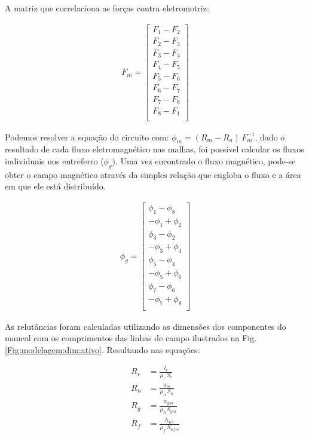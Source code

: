A matriz que correlaciona as forças contra eletromotriz:

\begin{align}
F_m = 
\begin{bmatrix}
	F_1 - F_2 \\
	F_2 - F_3 \\
	F_3 - F_4 \\
	F_4 - F_5 \\
	F_5 - F_6 \\
	F_6 - F_7 \\
	F_7 - F_8 \\
	F_8 - F_1 \\
\end{bmatrix}
\end{align}

Podemos resolver a equação do circuito com: $ \phi_m = (R_m - R_a) \, F_m^{-1}$, dado o resultado de cada fluxo eletromagnético nas malhas, foi possível calcular os fluxos individuais nos entreferro ($\phi_g$). Uma vez encontrado o fluxo magnético, pode-se obter o campo magnético através da simples relação que engloba o fluxo e a área em que ele está distribuído.

\begin{align}
	\phi_g = 
	\begin{bmatrix}
		 \phi_1 - \phi_8 \\
		-\phi_1 + \phi_2 \\ 
		\phi_3 - \phi_2 \\ 
		-\phi_3 + \phi_4 \\ 
		\phi_5 - \phi_4 \\ 
		-\phi_5 + \phi_6 \\ 
		\phi_7- \phi_6  \\
		-\phi_7+ \phi_8 \\
	\end{bmatrix}
	\label{eq:ativo:fluxo:entreferro}
\end{align}

As relutâncias foram calculadas utilizando as dimensões dos componentes do mancal com os comprimentos das linhas de campo ilustrados na Fig. \ref{Fig:modelagem:dim:ativo}. Resultando nas equações:

\begin{align}
R_{r}  &= \frac{l_r}{\mu_r \, S_r}			\\
R_{n} &= \frac{w_{n}}{\mu_{n}\, S_{n}}  \\     
R_{g} &= \frac{w_{gni}}{\mu_{0}\, S_{gni}}   \\    
R_{f} &= \frac{h_{fei}}{\mu_{f} \, S_{wfei}}    
\end{align}



